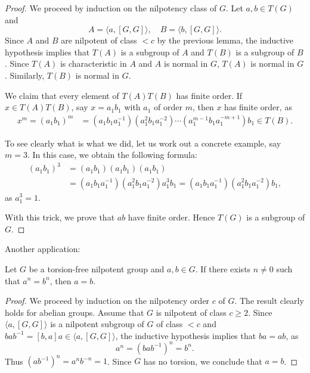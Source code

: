 \begin{proof}
We proceed by induction on the nilpotency class of $G$. 
Let $a,b\in T(G)$ and 
\[
	A=\langle a,[G,G]\rangle,\quad
	B=\langle b,[G,G]\rangle.
\]
Since  $A$ and $B$ are nilpotent of class $<c$ by the previous lemma, 
the inductive hypothesis 
implies that $T(A)$ is a subgroup of $A$ and $T(B)$ is a subgroup of $B$.
Since $T(A)$ is characteristic in $A$ and $A$ is normal in $G$, $T(A)$ is normal in $G$. 
Similarly, $T(B)$ is normal in $G$. 

We claim that every element of 
$T(A)T(B)$ has finite order. If 
$x\in T(A)T(B)$, say $x=a_1b_1$ with
$a_1$ of order $m$, then $x$ has finite order, as 
\begin{align*}
x^m=(a_1b_1)^m&=%
(a_1b_1a_1^{-1})(a_1^2b_1a_1^{-2})\cdots (a_1^{m-1} b_1 a_1^{-m+1})b_1\in T(B).
\end{align*}

To see clearly what is what we did, let us work out a concrete 
example, say $m=3$. In this case, we obtain the following formula:
\begin{align*}
(a_1b_1)^3&=(a_1b_1)(a_1b_1)(a_1b_1)\\
&=(a_1b_1a_1^{-1})(a_1^2b_1a_1^{-2})a_1^3b_1
=(a_1b_1a_1^{-1})(a_1^2b_1a_1^{-2})b_1,
\end{align*}
as $a_1^3=1$.

With this trick, we prove that $ab$ have finite order. Hence $T(G)$ 
is a subgroup of $G$. 
\end{proof}

Another application:

\begin{theorem}
\label{thm:a=b}
Let $G$ be a torsion-free nilpotent group and $a,b\in G$. If there exists 
$n\ne 0$ such that $a^n=b^n$, then $a=b$.
\end{theorem}

\begin{proof}
We proceed by induction on the nilpotency order $c$ of $G$. 
The result clearly holds for abelian groups. Assume that $G$ is nilpotent of class $c\geq2$. 
Since $\langle a,[G,G]\rangle$ is a nilpotent subgroup of $G$ of class $<c$
and $bab^{-1}=[b,a]a\in \langle
a,[G,G]\rangle$, the inductive hypothesis implies that 
$ba=ab$, as 
\[
	a^n=(bab^{-1})^n=b^n.
\]
Thus $(ab^{-1})^n=a^nb^{-n}=1$. Since $G$ has no torsion, we conclude that 
$a=b$.
\end{proof}

